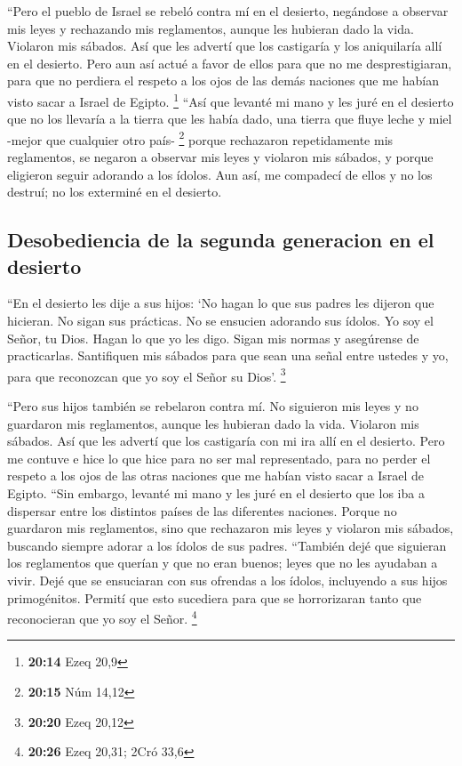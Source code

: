  ``Pero el pueblo de Israel se rebeló contra mí en el
desierto, negándose a observar mis leyes y rechazando mis reglamentos,
aunque les hubieran dado la vida. Violaron mis sábados. Así que les
advertí que los castigaría y los aniquilaría allí en el desierto.
 Pero aun así actué a favor de ellos para que no me
desprestigiaran, para que no perdiera el respeto a los ojos de las demás
naciones que me habían visto sacar a Israel de Egipto. \footnote{\textbf{20:14}
  Ezeq 20,9}  ``Así que levanté mi mano y les juré en el
desierto que no los llevaría a la tierra que les había dado, una tierra
que fluye leche y miel -mejor que cualquier otro país- \footnote{\textbf{20:15}
  Núm 14,12}  porque rechazaron repetidamente mis
reglamentos, se negaron a observar mis leyes y violaron mis sábados, y
porque eligieron seguir adorando a los ídolos.  Aun así,
me compadecí de ellos y no los destruí; no los exterminé en el desierto.

\hypertarget{desobediencia-de-la-segunda-generacion-en-el-desierto}{%
\subsection{Desobediencia de la segunda generacion en el
desierto}\label{desobediencia-de-la-segunda-generacion-en-el-desierto}}

 ``En el desierto les dije a sus hijos: `No hagan lo que
sus padres les dijeron que hicieran. No sigan sus prácticas. No se
ensucien adorando sus ídolos.  Yo soy el Señor, tu Dios.
Hagan lo que yo les digo. Sigan mis normas y asegúrense de practicarlas.
 Santifiquen mis sábados para que sean una señal entre
ustedes y yo, para que reconozcan que yo soy el Señor su Dios'.
\footnote{\textbf{20:20} Ezeq 20,12}

 ``Pero sus hijos también se rebelaron contra mí. No
siguieron mis leyes y no guardaron mis reglamentos, aunque les hubieran
dado la vida. Violaron mis sábados. Así que les advertí que los
castigaría con mi ira allí en el desierto.  Pero me
contuve e hice lo que hice para no ser mal representado, para no perder
el respeto a los ojos de las otras naciones que me habían visto sacar a
Israel de Egipto.  ``Sin embargo, levanté mi mano y les
juré en el desierto que los iba a dispersar entre los distintos países
de las diferentes naciones.  Porque no guardaron mis
reglamentos, sino que rechazaron mis leyes y violaron mis sábados,
buscando siempre adorar a los ídolos de sus padres. 
``También dejé que siguieran los reglamentos que querían y que no eran
buenos; leyes que no les ayudaban a vivir.  Dejé que se
ensuciaran con sus ofrendas a los ídolos, incluyendo a sus hijos
primogénitos. Permití que esto sucediera para que se horrorizaran tanto
que reconocieran que yo soy el Señor. \footnote{\textbf{20:26} Ezeq
  20,31; 2Cró 33,6}

